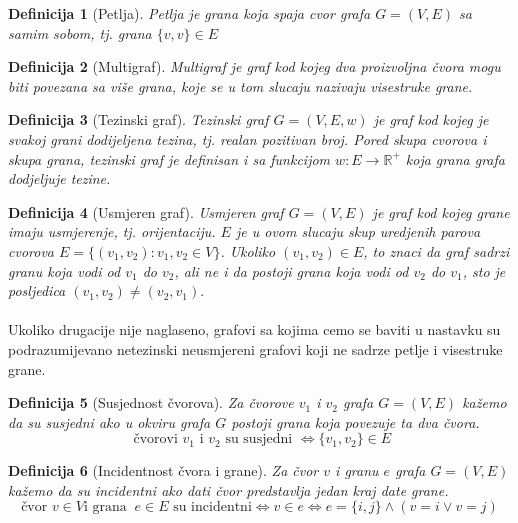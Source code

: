 \documentclass[11pt]{article}
\newtheorem{definition}{Definicija}
\begin{document}
		\begin{definition}[Petlja]
		Petlja je grana koja spaja cvor grafa $G=(V,E)$ sa samim sobom, tj. grana $\{v,v\} \in E$
		\end{definition}
	
		\begin{definition}[Multigraf]
		Multigraf je graf kod kojeg dva proizvoljna čvora mogu biti povezana sa više grana, koje se u tom slucaju nazivaju visestruke grane.
		\end{definition}
	
		\begin{definition}[Tezinski graf]
		Tezinski graf  $G =(V,E,w)$ je graf kod kojeg je svakoj grani dodijeljena tezina, tj. realan pozitivan broj. Pored skupa cvorova i skupa grana, tezinski graf je definisan i sa funkcijom $w: E \to \mathbb{R}^+$ koja grana grafa dodjeljuje tezine.
		\end{definition}
	
		\begin{definition}[Usmjeren graf]
		Usmjeren graf $G =(V,E)$ je graf kod kojeg grane imaju usmjerenje, tj. orijentaciju. $E$ je u ovom slucaju skup uredjenih parova cvorova $E = \{ (v_1,v_2) : v_1, v_2 \in V\}$. 
		Ukoliko $(v_1,v_2) \in E$, to znaci da graf sadrzi granu koja vodi od $v_1$ do $v_2$, ali ne i da postoji grana koja vodi od $v_2$ do $v_1$, sto je posljedica $(v_1,v_2) \neq (v_2,v_1).$
		\end{definition}
	
			\paragraph{}
			Ukoliko drugacije nije naglaseno, grafovi sa kojima cemo se baviti u nastavku su podrazumijevano netezinski neusmjereni grafovi koji ne sadrze petlje i visestruke grane.
	
		\begin{definition}[Susjednost čvorova]
		Za čvorove $v_1$ i $v_2$ grafa $G = (V, E)$ kažemo da su susjedni ako u okviru grafa $G$ postoji grana koja povezuje ta dva čvora. 
		\[\text{ čvorovi } v_1  \text{ i } v_2 \text{ su susjedni } \Leftrightarrow \{v_1, v_2\} \in E \]
		\end{definition}
		
		\begin{definition}[Incidentnost čvora i grane]
		Za čvor $v$ i granu $e$ grafa $G = (V, E)$ kažemo da su incidentni ako dati čvor predstavlja jedan kraj date grane.
		\[ \text{čvor } v \in V \text{i grana }\ e \in E \text{ su incidentni} \Leftrightarrow v \in e \Leftrightarrow e = \{i,j\} \land ( v = i  \lor  v = j) \] 
		\end{definition}
	
\end{document}
